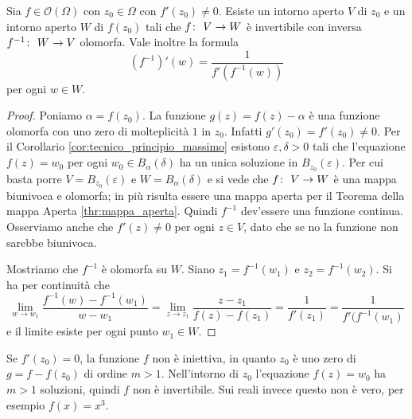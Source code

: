\begin{theorem}
	  \label{thr:mappa_inversa}
  Sia $f \in \mathcal{O}(\Omega)$ con $z_0 \in \Omega$ con $f'(z_0) \neq 0$.
  Esiste un intorno aperto $V$ di $z_0$ e un intorno aperto $W$ di $f(z_0)$
  tali che $f \colon\ V \rightarrow W$ è invertibile con inversa
  $f^{-1} \colon\ W \rightarrow V$ olomorfa. Vale inoltre la formula
  \begin{equation*}
    (f^{-1})'(w) = \frac{1}{f'(f^{-1}(w))}
  \end{equation*}
  per ogni $w \in W$.
\end{theorem}
\begin{proof}
  Poniamo $\alpha = f(z_0)$. La funzione $g(z) = f(z) - \alpha$ è una funzione
  olomorfa con uno zero di molteplicità $1$ in $z_0$. Infatti $g'(z_0) = f'(z_0)
  \neq 0$. Per il Corollario \ref{cor:tecnico_principio_massimo} esistono
  $\varepsilon, \delta > 0$ tali che l'equazione $f(z) = w_0$ per ogni $w_0 \in
  B_\alpha(\delta)$ ha un unica soluzione in $B_{z_0}(\varepsilon)$. Per cui
  basta porre $V = B_{z_0}(\varepsilon)$ e $W = B_\alpha(\delta)$ e si vede che 
  $f \colon\ V \rightarrow W$ è una mappa biunivoca e olomorfa; in più risulta essere
  una mappa aperta per il Teorema della mappa Aperta \ref{thr:mappa_aperta}.
  Quindi $f^{-1}$ dev'essere una funzione continua. Osserviamo anche che $f'(z)
  \neq 0$ per ogni $z\in V$, dato che se no la funzione non sarebbe biunivoca.

  Mostriamo che $f^{-1}$ è olomorfa su $W$. Siano $z_1 = f^{-1}(w_1)$ e $z_2
  = f^{-1}(w_2)$. Si ha per continuità che 
  \begin{equation*}
    \lim_{w \to w_1} \frac{f^{-1}(w) - f^{-1}(w_1)}{w-w_1} = \lim_{z \to z_1}
    \frac{z-z_1}{f(z)- f(z_1)} = \frac{1}{f'(z_1)} = \frac{1}{f'(f^{-1}(w_1)}
  \end{equation*}
  e il limite esiste per ogni punto $w_1 \in W$.
\end{proof}

\begin{remark}
  Se $f'(z_0) = 0$, la funzione $f$ non è iniettiva, in quanto $z_0$ è uno zero
  di $g = f - f(z_0)$ di ordine $m > 1$. Nell'intorno di $z_0$ l'equazione $f(z)
  = w_0$ ha $m > 1$ soluzioni, quindi $f$ non è invertibile. Sui reali invece
  questo non è vero, per esempio $f(x) = x^3$.
  \label{rmk:complessi_limitano_le_inverse}
\end{remark}
